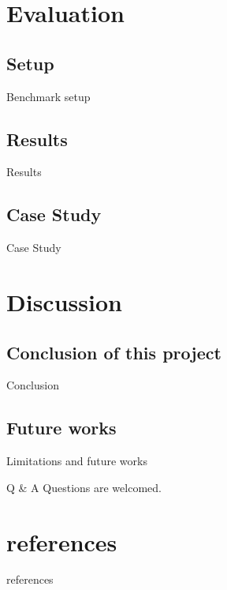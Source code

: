 \documentclass[11pt]{beamer}
\begin{document}
\section{Evaluation}
\subsection{Setup}
\begin{frame}{Benchmark setup}

\end{frame}
\subsection{Results}
\begin{frame}{Results}

\end{frame}
\subsection{Case Study}
\begin{frame}{Case Study}

\end{frame}

\section{Discussion}
\subsection{Conclusion of this project}
\begin{frame}{Conclusion}
\end{frame}
\subsection{Future works}
\begin{frame}{Limitations and future works}
\end{frame}
\begin{frame}[c]{Q \& A}
	Questions are welcomed.
\end{frame}

\appendix

\section{references}
\begin{frame}[allowframebreaks]{references}
	\nocite{*}
	\renewcommand*{\bibfont}{\tiny}
	\printbibliography
\end{frame}
\end{document}
